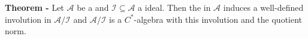 \documentclass[12pt]{article}
\begin{document}

{\bf Theorem -} Let $\mathcal{A}$ be a  and $\mathcal{I}\subseteq \mathcal{A}$ a  ideal. Then the  in $\mathcal{A}$ induces a well-defined involution in $\mathcal{A}/\mathcal{I}$ and $\mathcal{A}/\mathcal{I}$ is a $C^*$-algebra with this involution and the quotient norm.
\end{document}
